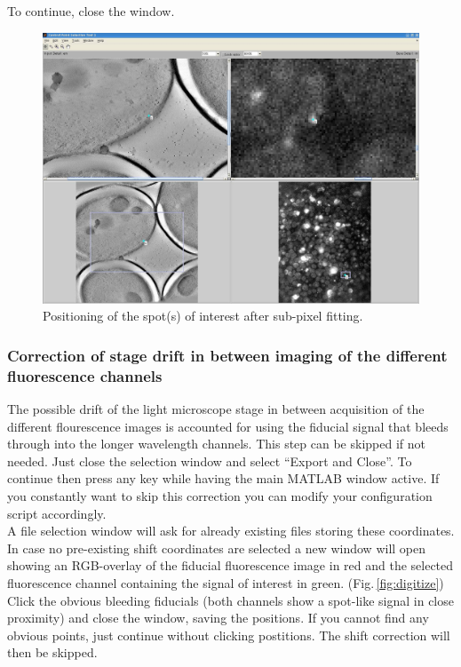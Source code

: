 \documentclass[10pt,a4paper,onepage,DIV12]{scrartcl}
\begin{document}
To continue, close the window. 



\begin{figure}
 \centering
 \includegraphics[width=.78\textwidth]{images/cpsel_fluor2.jpg}
 \caption{Positioning of the spot(s) of interest after sub-pixel fitting.}
 \label{fig:cpsel_fluor2}
\end{figure}

\subsubsection{Correction of stage drift in between imaging of the different fluorescence channels}
The possible drift of the light microscope stage in between acquisition of the different flourescence images is accounted for using the fiducial signal that bleeds through into the longer wavelength channels. This step can be skipped if not needed. Just close the selection window and select ``Export and Close''. To continue then press any key while having the main MATLAB window active. If you constantly want to skip this correction you can modify your configuration script accordingly.\\

A file selection window will ask for already existing files storing these coordinates.\\

In case no pre-existing shift coordinates are selected a new window will open showing an RGB-overlay of the fiducial fluorescence image in red and the selected fluorescence channel containing the signal of interest in green. (Fig.\,\ref{fig:digitize}) %
Click the obvious bleeding fiducials (both channels show a spot-like signal in close proximity) and close the window, saving the positions. If you cannot find any obvious points, just continue without clicking postitions. The shift correction will then be skipped.\\
\end{document}
